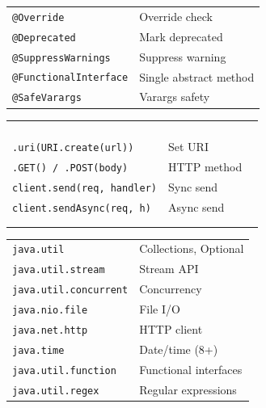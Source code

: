 \documentclass[10pt]{extarticle}
\begin{document}
\begin{multicols}{2}
\begin{tabularx}{\linewidth}{@{}l@{\enspace}Y@{}}
\texttt{@Override}              & Override check \\
\texttt{@Deprecated}           & Mark deprecated \\
\texttt{@SuppressWarnings}     & Suppress warning \\
\texttt{@FunctionalInterface}  & Single abstract method \\
\texttt{@SafeVarargs}          & Varargs safety \\
\end{tabularx}

\begin{tabularx}{\linewidth}{@{}>{\raggedright\arraybackslash}p{0.62\linewidth}@{\enspace}Y@{}}
 & \\
 \\
 & \\
 \\
\texttt{.uri(URI.create(url))}          & Set URI \\
\texttt{.GET() / .POST(body)}          & HTTP method \\
\texttt{client.send(req, handler)}      & Sync send \\
\texttt{client.sendAsync(req, h)}       & Async send \\
 & \\
 \\
\end{tabularx}

\begin{tabularx}{\linewidth}{@{}l@{\enspace}Y@{}}
\texttt{java.util}              & Collections, Optional \\
\texttt{java.util.stream}       & Stream API \\
\texttt{java.util.concurrent}   & Concurrency \\
\texttt{java.nio.file}          & File I/O \\
\texttt{java.net.http}          & HTTP client \\
\texttt{java.time}              & Date/time (8+) \\
\texttt{java.util.function}     & Functional interfaces \\
\texttt{java.util.regex}        & Regular expressions \\
\end{tabularx}

\end{multicols}
\end{document}
